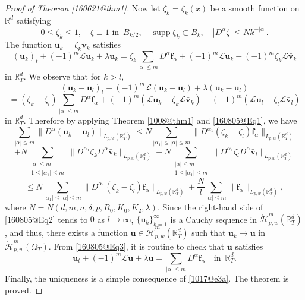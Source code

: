 \documentclass[reqno]{amsart}
\numberwithin{equation}{section}
\theoremstyle{plain}
\theoremstyle{definition}
\theoremstyle{remark}
\begin{document}
\begin{proof}[Proof of Theorem \ref{160621@thm1}]
Now let $\zeta_k=\zeta_k(x)$ be a smooth function on ${\mathbb{R}}^d$ satisfying 
$$
0\le \zeta_k\le 1, \quad \zeta\equiv 1 \text{ in }\, B_{k/2}, \quad \operatorname{supp}\zeta_k\subset B_k, \quad |D^\alpha\zeta|\le Nk^{-|\alpha|}.
$$
The function ${\boldsymbol{u}}_k=\zeta_k \bar{{\boldsymbol{v}}}_k$ satisfies 
\begin{equation}		\label{160805@Eq3}
({\boldsymbol{u}}_k)_t+(-1)^m {\mathcal{L}} {\boldsymbol{u}}_k+\lambda {\boldsymbol{u}}_k=\zeta_k\sum_{|\alpha|\le m}D^\alpha {\boldsymbol{f}}_\alpha+(-1)^m{\mathcal{L}}{\boldsymbol{u}}_k-(-1)^m\zeta_k{\mathcal{L}}\bar{{\boldsymbol{v}}}_k
\end{equation}
in ${\mathbb{R}}^d_T$.
We observe that for $k>l$,   
$$
({\boldsymbol{u}}_k-{\boldsymbol{u}}_l)_t+(-1)^m {\mathcal{L}}({\boldsymbol{u}}_k-{\boldsymbol{u}}_l)+\lambda ({\boldsymbol{u}}_k-{\boldsymbol{u}}_l)
$$
$$
=(\zeta_k-\zeta_l)\sum_{|\alpha|\le m}D^{\alpha}{\boldsymbol{f}}_\alpha+(-1)^m({\mathcal{L}} {\boldsymbol{u}}_k- \zeta_k {\mathcal{L}}\bar{{\boldsymbol{v}}}_k)-(-1)^m({\mathcal{L}} {\boldsymbol{u}}_l- \zeta_l {\mathcal{L}}\bar{{\boldsymbol{v}}}_l)
$$
in ${\mathbb{R}}^d_T$.
Therefore by applying Theorem \ref{1008@thm1} and \eqref{160805@Eq1}, we have 
$$
\sum_{|\alpha|\le m}\|D^\alpha ({\boldsymbol{u}}_k-{\boldsymbol{u}}_l)\|_{L_{p,w}({\mathbb{R}}^d_T)}\le N\sum_{|\alpha_1|\le |\alpha|\le m} \|D^{\alpha_1}(\zeta_k-\zeta_l){\boldsymbol{f}}_\alpha\|_{L_{p,w}({\mathbb{R}}^d_T)}
$$
$$
+N\sum_{\substack{|\alpha|\le m\\ 1\le |\alpha_1|\le m}}\|D^{\alpha_1}\zeta_k D^\alpha \bar{{\boldsymbol{v}}}_k\|_{L_{p,w}({\mathbb{R}}^d_T)}
+N\sum_{\substack{|\alpha|\le m\\ 1\le |\alpha_1|\le m}}\|D^{\alpha_1}\zeta_l D^\alpha \bar{{\boldsymbol{v}}}_l\|_{L_{p,w}({\mathbb{R}}^d_T)}
$$
\begin{equation}		\label{160805@Eq2}
\le N\sum_{|\alpha_1|\le |\alpha|\le m} \|D^{\alpha_1}(\zeta_k-\zeta_l){\boldsymbol{f}}_\alpha\|_{L_{p,w}({\mathbb{R}}^d_T)}
+\frac{N}{l}\sum_{|\alpha|\le m}\|{\boldsymbol{f}}_\alpha\|_{L_{p,w}({\mathbb{R}}^d_T)},
\end{equation}
where $N=N(d,m,n,\delta,p,R_0,K_0,K_2, \lambda)$.
Since the right-hand side of \eqref{160805@Eq2} tends to $0$ as $l\to \infty$, 
$\{{\boldsymbol{u}}_k\}_{k=1}^\infty$ is a Cauchy sequence in $\mathring{\mathcal{H}}^m_{p,w}({\mathbb{R}}^d_T)$, and thus, there exists a function ${\boldsymbol{u}}\in \mathring{\mathcal{H}}^m_{p,w}({\mathbb{R}}^d_T)$ such that ${\boldsymbol{u}}_k\to {\boldsymbol{u}}$ in $\mathring{\mathcal{H}}^m_{p,w}(\Omega_T)$.
From \eqref{160805@Eq3}, it is routine to check that ${\boldsymbol{u}}$ satisfies 
$$
{\boldsymbol{u}}_t+(-1)^m{\mathcal{L}}{\boldsymbol{u}}+\lambda {\boldsymbol{u}}=\sum_{|\alpha|\le m}D^{\alpha}{\boldsymbol{f}}_\alpha \quad \text{in }\, {\mathbb{R}}^d_T.
$$
Finally, the uniqueness is a simple consequence of \eqref{1017@e3a}.
The theorem is proved.
\end{proof}
\end{document}
